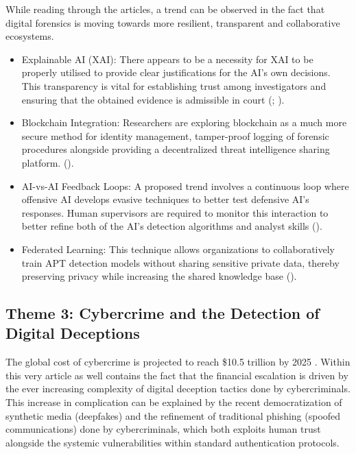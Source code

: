 \documentclass[12pt,a4paper]{article}
\begin{document}
While reading through the articles, a trend can be observed in the fact that digital forensics is moving towards more resilient, transparent and collaborative ecosystems.
\begin{itemize}
\item  Explainable AI (XAI): There appears to be a necessity for XAI to be properly utilised to provide clear justifications for the AI's own decisions. This transparency is vital for establishing trust among investigators and ensuring that the obtained evidence is admissible in court (\cite{11166697}; \cite{11385975}).

\item  Blockchain Integration: Researchers are exploring blockchain as a much more secure method for identity management, tamper-proof logging of forensic procedures alongside providing a decentralized threat intelligence sharing platform. (\cite{11166697}).

\item  AI-vs-AI Feedback Loops: A proposed trend involves a continuous loop where offensive AI develops evasive techniques to better test defensive AI's responses. Human supervisors are required to monitor this interaction to better refine both of the AI's detection algorithms and analyst skills (\cite{sanna2025improving}).

\item  Federated Learning: This technique allows organizations to collaboratively train APT detection models without sharing sensitive private data, thereby preserving privacy while increasing the shared knowledge base (\cite{11166697}).
\end{itemize}

\subsection{Theme 3: Cybercrime and the Detection of Digital Deceptions}

The global cost of cybercrime is projected to reach \$10.5 trillion by 2025 \cite{11480014}. Within this very article as well contains the fact that the financial escalation is driven by the ever increasing complexity of digital deception tactics done by cybercriminals.
This increase in complication can be explained by the recent democratization of synthetic media (deepfakes) and the refinement of traditional phishing (spoofed communications) done by cybercriminals, which both exploits human trust alongside the systemic vulnerabilities within standard authentication protocols.
\end{document}
